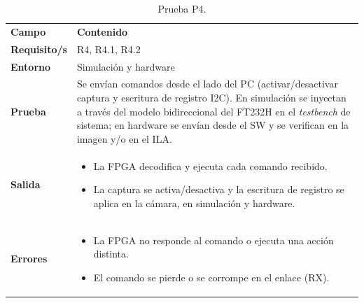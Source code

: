 \documentclass[../main.tex]{subfiles}
\begin{document}
\begin{table}[H]
\centering
\caption{Prueba P4.}
\label{tab:prueba_p4}
\begin{tabular}{>{\raggedright\arraybackslash}p{2.5cm}>{\raggedright\arraybackslash}p{11cm}}
\rowcolor[HTML]{156082}
{\color{white}\textbf{Campo}} & {\color{white}\textbf{Contenido}} \\
\rowcolor[HTML]{C0E6F5}
\textbf{Requisito/s} & R4, R4.1, R4.2 \\
\textbf{Entorno} & Simulación y hardware \\
\rowcolor[HTML]{C0E6F5}
\textbf{Prueba} & Se envían comandos desde el lado del PC (activar/desactivar captura y escritura de registro I2C). En simulación se inyectan a través del modelo bidireccional del FT232H en el \emph{testbench} de sistema; en hardware se envían desde el \ac{SW} y se verifican en la imagen y/o en el ILA. \\
\textbf{Salida} & \begin{itemize}\setlength{\itemsep}{0pt}
    \item La FPGA decodifica y ejecuta cada comando recibido.
    \item La captura se activa/desactiva y la escritura de registro se aplica en la cámara, en simulación y hardware.
\end{itemize} \\
\rowcolor[HTML]{C0E6F5}
\textbf{Errores} & \begin{itemize}\setlength{\itemsep}{0pt}
    \item La FPGA no responde al comando o ejecuta una acción distinta.
    \item El comando se pierde o se corrompe en el enlace (RX).
\end{itemize} \\
\end{tabular}
\end{table}
\end{document}
